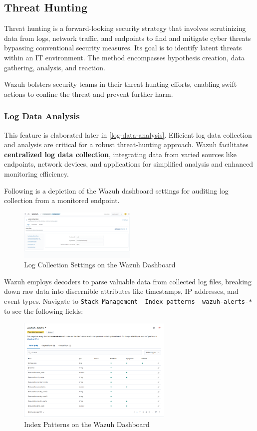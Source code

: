 \subsection{Threat Hunting}
Threat hunting is a forward-looking security strategy that involves scrutinizing data from logs, network traffic, and endpoints to find and mitigate cyber threats bypassing conventional security measures. Its goal is to identify latent threats within an IT environment. The method encompasses hypothesis creation, data gathering, analysis, and reaction.

Wazuh bolsters security teams in their threat hunting efforts, enabling swift actions to confine the threat and prevent further harm.

\subsubsection{Log Data Analysis}
This feature is elaborated later in \ref{log-data-analysis}. Efficient log data collection and analysis are critical for a robust threat-hunting approach. Wazuh facilitates \textbf{centralized log data collection}, integrating data from varied sources like endpoints, network devices, and applications for simplified analysis and enhanced monitoring efficiency.

Following is a depiction of the Wazuh dashboard settings for auditing log collection from a monitored endpoint.

\begin{figure}[H]
    \centering
    \includegraphics[width=0.5\textwidth]{images/threat-hunting/log-collection-settings.png}
    \caption{Log Collection Settings on the Wazuh Dashboard}
    \label{fig:log-collection-settings}
\end{figure}

Wazuh employs decoders to parse valuable data from collected log files, breaking down raw data into discernible attributes like timestamps, IP addresses, and event types. Navigate to \texttt{Stack Management \textlangle~Index patterns \textlangle~wazuh-alerts-*} to see the following fields:
\begin{figure}[H]
    \centering
    \includegraphics[height=5cm]{images/threat-hunting/wazuh-alerts-index-pattern.png}
    \caption{Index Patterns on the Wazuh Dashboard}
    \label{fig:wazuh-alerts-index-pattern}
\end{figure}

